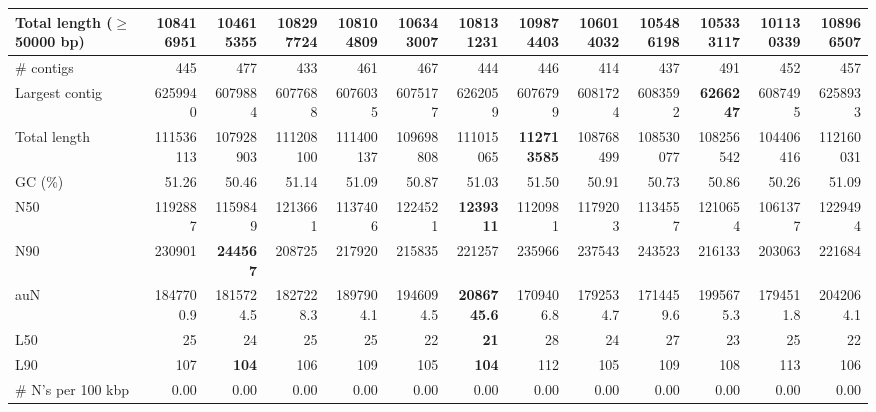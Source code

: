 \documentclass[12pt,a4paper]{article}
\begin{document}
\begin{table}[ht]
\begin{center}
\begin{tabular}{|l*{12}{|r}|}
Total length ($\geq$ 50000 bp) & 108416951 & 104615355 & 108297724 & 108104809 & 106343007 & 108131231 & {\bf 109874403} & 106014032 & 105486198 & 105333117 & 101130339 & 108966507 \\ \hline
\# contigs & 445 & 477 & 433 & 461 & 467 & 444 & 446 & 414 & 437 & 491 & 452 & 457 \\ \hline
Largest contig & 6259940 & 6079884 & 6077688 & 6076035 & 6075177 & 6262059 & 6076799 & 6081724 & 6083592 & {\bf 6266247} & 6087495 & 6258933 \\ \hline
Total length & 111536113 & 107928903 & 111208100 & 111400137 & 109698808 & 111015065 & {\bf 112713585} & 108768499 & 108530077 & 108256542 & 104406416 & 112160031 \\ \hline
GC (\%) & 51.26 & 50.46 & 51.14 & 51.09 & 50.87 & 51.03 & 51.50 & 50.91 & 50.73 & 50.86 & 50.26 & 51.09 \\ \hline
N50 & 1192887 & 1159849 & 1213661 & 1137406 & 1224521 & {\bf 1239311} & 1120981 & 1179203 & 1134557 & 1210654 & 1061377 & 1229494 \\ \hline
N90 & 230901 & {\bf 244567} & 208725 & 217920 & 215835 & 221257 & 235966 & 237543 & 243523 & 216133 & 203063 & 221684 \\ \hline
auN & 1847700.9 & 1815724.5 & 1827228.3 & 1897904.1 & 1946094.5 & {\bf 2086745.6} & 1709406.8 & 1792534.7 & 1714459.6 & 1995675.3 & 1794511.8 & 2042064.1 \\ \hline
L50 & 25 & 24 & 25 & 25 & 22 & {\bf 21} & 28 & 24 & 27 & 23 & 25 & 22 \\ \hline
L90 & 107 & {\bf 104} & 106 & 109 & 105 & {\bf 104} & 112 & 105 & 109 & 108 & 113 & 106 \\ \hline
\# N's per 100 kbp & 0.00 & 0.00 & 0.00 & 0.00 & 0.00 & 0.00 & 0.00 & 0.00 & 0.00 & 0.00 & 0.00 & 0.00 \\ \hline
\end{tabular}
\end{center}
\end{table}
\end{document}
